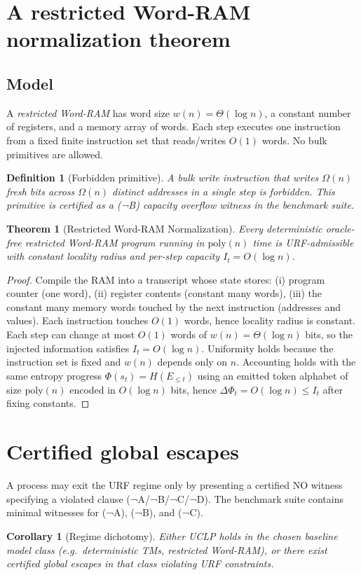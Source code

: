 \documentclass[11pt]{article}
\newtheorem{theorem}{Theorem}
\newtheorem{definition}{Definition}
\newtheorem{corollary}{Corollary}
\begin{document}
\section{A restricted Word-RAM normalization theorem}

\subsection{Model}
A \emph{restricted Word-RAM} has word size $w(n)=\Theta(\log n)$, a constant number of registers,
and a memory array of words. Each step executes one instruction from a fixed finite instruction set
that reads/writes $O(1)$ words. No bulk primitives are allowed.

\begin{definition}[Forbidden primitive]
A \emph{bulk write} instruction that writes $\Omega(n)$ fresh bits across $\Omega(n)$ distinct
addresses in a single step is forbidden. This primitive is certified as a (¬B) capacity overflow
witness in the benchmark suite.
\end{definition}

\begin{theorem}[Restricted Word-RAM Normalization]
Every deterministic oracle-free restricted Word-RAM program running in $\mathrm{poly}(n)$ time is
URF-admissible with constant locality radius and per-step capacity $I_t=O(\log n)$.
\end{theorem}

\begin{proof}
Compile the RAM into a transcript whose state stores:
(i) program counter (one word),
(ii) register contents (constant many words),
(iii) the constant many memory words touched by the next instruction (addresses and values).
Each instruction touches $O(1)$ words, hence locality radius is constant.
Each step can change at most $O(1)$ words of $w(n)=\Theta(\log n)$ bits, so the injected information
satisfies $I_t=O(\log n)$.
Uniformity holds because the instruction set is fixed and $w(n)$ depends only on $n$.
Accounting holds with the same entropy progress $\Phi(s_t)=H(E_{\le t})$ using an emitted token
alphabet of size $\mathrm{poly}(n)$ encoded in $O(\log n)$ bits, hence $\Delta\Phi_t=O(\log n)\le I_t$
after fixing constants.
\end{proof}

\section{Certified global escapes}
A process may exit the URF regime only by presenting a certified NO witness specifying a violated clause
(¬A/¬B/¬C/¬D). The benchmark suite contains minimal witnesses for (¬A), (¬B), and (¬C).

\begin{corollary}[Regime dichotomy]
Either UCLP holds in the chosen baseline model class (e.g.\ deterministic TMs, restricted Word-RAM), or there exist
certified global escapes in that class violating URF constraints.
\end{corollary}
\end{document}
